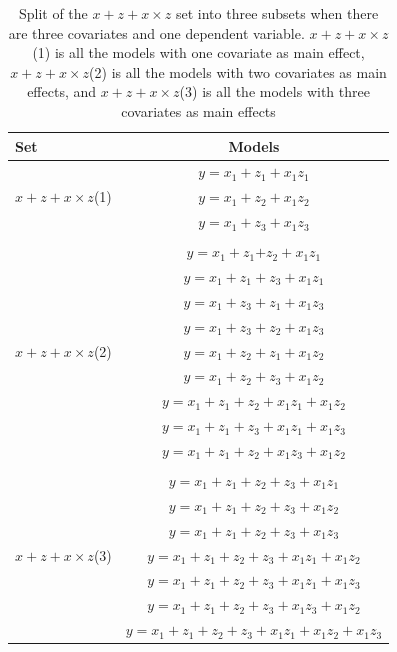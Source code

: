 \begin{table}[hbt!]
\caption{Split of the $x + z + x \times z$ set into three subsets when there are three covariates and one dependent variable. $x + z + x \times z$(1) is all the models with one covariate as main effect, $x + z + x \times z$(2) is all the models with two covariates as main effects, and $x + z + x \times z$(3) is all the models with three covariates as main effects}
\centering\label{tab:appmodel2}
\begin{tabular}{lc}  
\toprule
Set & Models \\
\midrule
\multirow{3}{*}{$x + z + x \times z$(1)} & $y=x_1+z_1+x_1z_1$\\ & $y=x_1+z_2+x_1z_2$\\ & $y=x_1+z_3+x_1z_3$\\ & \\ 
\multirow{9}{*}{$x + z + x \times z$(2)} & $y=x_1+z_1$$+z_2+x_1z_1$\\ & $y=x_1+z_1+z_3+x_1z_1$\\ & $y=x_1+z_3+z_1+x_1z_3$\\ & $y=x_1+z_3+z_2+x_1z_3$\\ & $y=x_1+z_2+z_1+x_1z_2$\\ & $y=x_1+z_2+z_3+x_1z_2$\\ & $y=x_1+z_1+z_2+x_1z_1+x_1z_2$\\ & $y=x_1+z_1+z_3+x_1z_1+x_1z_3$\\ & $y=x_1+z_1+z_2+x_1z_3+x_1z_2$\\  & \\  
\multirow{7}{*}{$x + z + x \times z$(3)} & $y=x_1+z_1+z_2+z_3+x_1z_1$\\ & $y=x_1+z_1+z_2+z_3+x_1z_2$\\ & $y=x_1+z_1+z_2+z_3+x_1z_3$\\ & $y=x_1+z_1+z_2+z_3+x_1z_1+x_1z_2$\\ & $y=x_1+z_1+z_2+z_3+x_1z_1+x_1z_3$\\ & $y=x_1+z_1+z_2+z_3+x_1z_3+x_1z_2$\\ & $y=x_1+z_1+z_2+z_3+x_1z_1+x_1z_2+x_1z_3$\\  
\bottomrule
\end{tabular}
\end{table}

